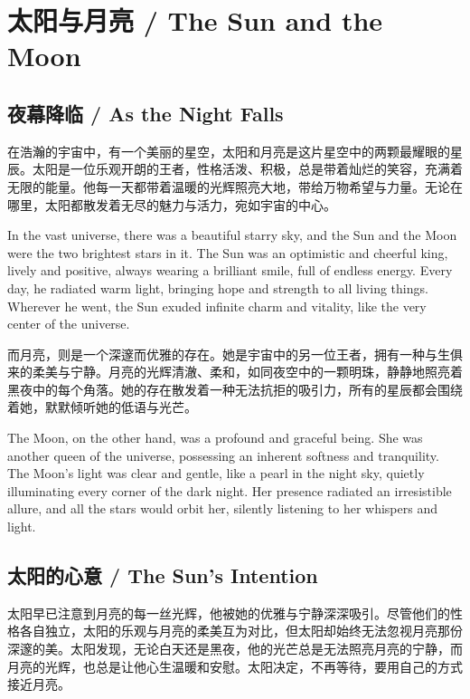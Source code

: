 \chapter*{太阳与月亮 / The Sun and the Moon}

\section*{夜幕降临 / As the Night Falls}

在浩瀚的宇宙中，有一个美丽的星空，太阳和月亮是这片星空中的两颗最耀眼的星辰。太阳是一位乐观开朗的王者，性格活泼、积极，总是带着灿烂的笑容，充满着无限的能量。他每一天都带着温暖的光辉照亮大地，带给万物希望与力量。无论在哪里，太阳都散发着无尽的魅力与活力，宛如宇宙的中心。

\begin{flushright}
In the vast universe, there was a beautiful starry sky, and the Sun and the Moon were the two brightest stars in it. The Sun was an optimistic and cheerful king, lively and positive, always wearing a brilliant smile, full of endless energy. Every day, he radiated warm light, bringing hope and strength to all living things. Wherever he went, the Sun exuded infinite charm and vitality, like the very center of the universe.
\end{flushright}

而月亮，则是一个深邃而优雅的存在。她是宇宙中的另一位王者，拥有一种与生俱来的柔美与宁静。月亮的光辉清澈、柔和，如同夜空中的一颗明珠，静静地照亮着黑夜中的每个角落。她的存在散发着一种无法抗拒的吸引力，所有的星辰都会围绕着她，默默倾听她的低语与光芒。

\begin{flushright}
The Moon, on the other hand, was a profound and graceful being. She was another queen of the universe, possessing an inherent softness and tranquility. The Moon's light was clear and gentle, like a pearl in the night sky, quietly illuminating every corner of the dark night. Her presence radiated an irresistible allure, and all the stars would orbit her, silently listening to her whispers and light.
\end{flushright}

\section*{太阳的心意 / The Sun’s Intention}

太阳早已注意到月亮的每一丝光辉，他被她的优雅与宁静深深吸引。尽管他们的性格各自独立，太阳的乐观与月亮的柔美互为对比，但太阳却始终无法忽视月亮那份深邃的美。太阳发现，无论白天还是黑夜，他的光芒总是无法照亮月亮的宁静，而月亮的光辉，也总是让他心生温暖和安慰。太阳决定，不再等待，要用自己的方式接近月亮。

